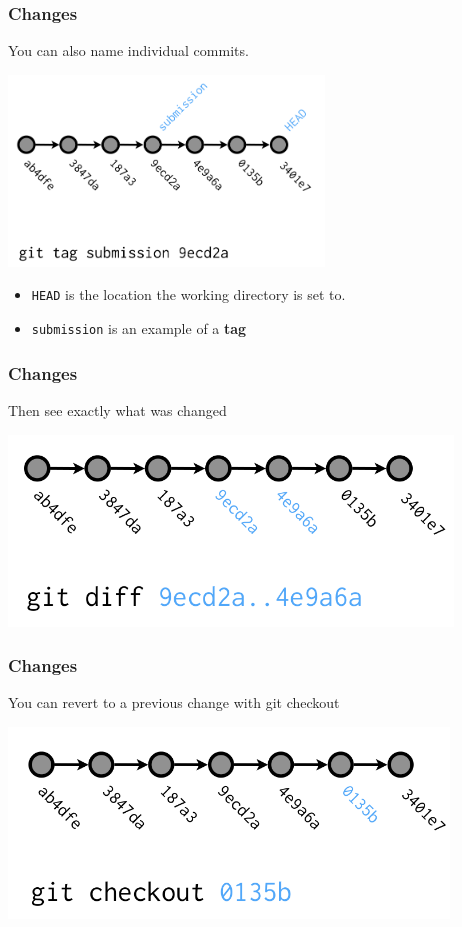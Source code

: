   \begin{frame}[t]
    \frametitle{Changes}
    You can also name individual commits.
    \begin{center}
      \includegraphics[height=2.00in]{../images/from-wickham-03.png} 
    \end{center} 

    \begin{itemize} 
      \item {\tt HEAD} is the location the working directory is set to.
      \item {\tt submission} is an example of a {\bf tag}
    \end{itemize} 
  \end{frame}

  \begin{frame}[t]
    \frametitle{Changes}
    Then see exactly what was changed 
    \begin{center}
      \includegraphics[height=2.00in]{../images/from-wickham-04.png} 
    \end{center} 
  \end{frame}

  \begin{frame}[t]
    \frametitle{Changes}
    You can revert to a previous change with git checkout
    \begin{center}
      \includegraphics[height=2.00in]{../images/from-wickham-05.png} 
    \end{center} 
  \end{frame}

